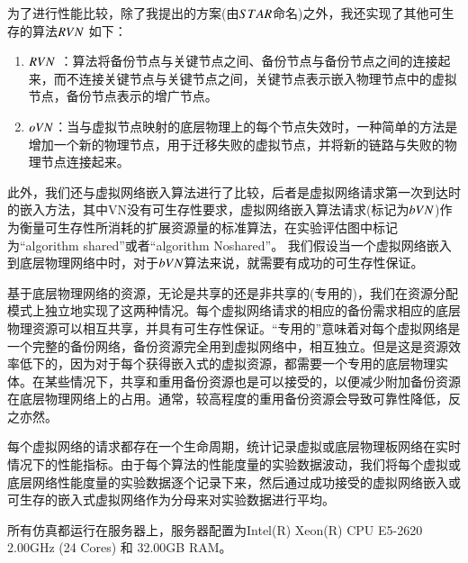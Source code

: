 为了进行性能比较，除了我提出的方案(由$STAR$命名)之外，我还实现了其他可生存的算法$RVN$  \cite{yeow2010designing}如下：
\begin{enumerate}
  \item $RVN$ ：算法将备份节点与关键节点之间、备份节点与备份节点之间的连接起来，而不连接关键节点与关键节点之间，关键节点表示嵌入物理节点中的虚拟节点，备份节点表示的增广节点。
  \item $oVN$：当与虚拟节点映射的底层物理上的每个节点失效时，一种简单的方法是增加一个新的物理节点，用于迁移失败的虚拟节点，并将新的链路与失败的物理节点连接起来。
\end{enumerate}

此外，我们还与虚拟网络嵌入算法\cite{liu2011completing}进行了比较，后者是虚拟网络请求第一次到达时的嵌入方法，其中VN没有可生存性要求，虚拟网络嵌入算法请求(标记为$bVN$)作为衡量可生存性所消耗的扩展资源量的标准算法，在实验评估图中标记为“algorithm shared”或者“algorithm Noshared”。 我们假设当一个虚拟网络嵌入到底层物理网络中时，对于$bVN$算法来说，就需要有成功的可生存性保证。

基于底层物理网络的资源，无论是共享的还是非共享的(专用的)\cite{lu2006efficient}，我们在资源分配模式上独立地实现了这两种情况。每个虚拟网络请求的相应的备份需求相应的底层物理资源可以相互共享，并具有可生存性保证。“专用的”意味着对每个虚拟网络是一个完整的备份网络，备份资源完全用到虚拟网络中，相互独立。但是这是资源效率低下的，因为对于每个获得嵌入式的虚拟资源，都需要一个专用的底层物理实体。在某些情况下，共享和重用备份资源也是可以接受的，以便减少附加备份资源在底层物理网络上的占用。通常，较高程度的重用备份资源会导致可靠性降低，反之亦然。

每个虚拟网络的请求都存在一个生命周期，统计记录虚拟或底层物理板网络在实时情况下的性能指标。由于每个算法的性能度量的实验数据波动，我们将每个虚拟或底层网络性能度量的实验数据逐个记录下来，然后通过成功接受的虚拟网络嵌入或可生存的嵌入式虚拟网络作为分母来对实验数据进行平均。

所有仿真都运行在服务器上，服务器配置为Intel(R) Xeon(R) CPU E5-2620 2.00GHz (24 Cores) 和 32.00GB RAM。
